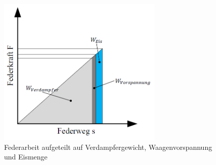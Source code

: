 

\begin{figure}
\centering		
\includegraphics[width=0.7\textwidth]{Pictures/Federarbeit.png}
\caption{Federarbeit aufgeteilt auf Verdampfergewicht, Waagenvorspannung und Eismenge}
\label{fig:Feder}
\end{figure}

